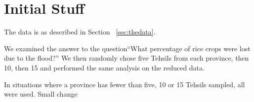 \section{Initial Stuff}
\label{sec:initial}
The data is as described in Section ~\ref{sec:thedata}.

We examined the answer to the question``What percentage of rice crops were lost due to the flood?''  We then randomly chose five Tehsils from each province, then 10, then 15 and performed the same analysis on the reduced data.

In situations where a province has fewer than five, 10 or 15 Tehsils sampled, all were used.
Small change
